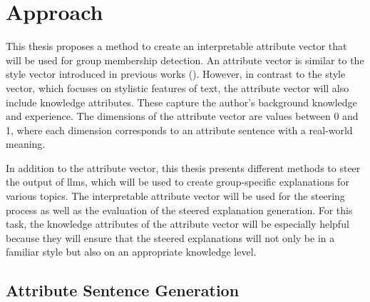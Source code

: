 \chapter{Approach}
\label{sec:approach}

This thesis proposes a method to create an interpretable attribute vector that will be used for group membership detection. An attribute vector is similar to the style vector introduced in previous works (\cite{konenStyleVectorsSteering2024,wegmannSameAuthorJust2022,patelLearningInterpretableStyle2023,alshomaryLatentSpaceInterpretation2024}). However, in contrast to the style vector, which focuses on stylistic features of text, the attribute vector will also include knowledge attributes. These capture the author's background knowledge and experience. %
The dimensions of the attribute vector are values between \num{0} and \num{1}, where each dimension corresponds to an attribute sentence with a real-world meaning.

In addition to the attribute vector, this thesis presents different methods to steer the output of \acp{llm}, which will be used to create group-specific explanations for various topics. The interpretable attribute vector will be used for the steering process as well as the evaluation of the steered explanation generation. For this task, the knowledge attributes of the attribute vector will be especially helpful because they will ensure that the steered explanations will not only be in a familiar style but also on an appropriate knowledge level.



\section{Attribute Sentence Generation}
\label{sec:approach:attributeSentenceGeneration}

